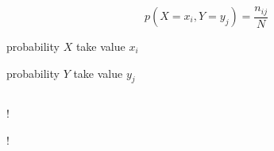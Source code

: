 \documentclass[11pt, a4paper, oneside]{book}
\begin{document}
\begin{equation}
p(X = x_i, Y = y_j) = \frac{n_{ij}}{N}
\tag{1.5}
\end{equation}

\begin{description}[labelwidth=\widthof{\bfseries 1234567890},align=parright]
	\item[$X = x_i :$] probability $X$ take value $x_i$
	\item[$Y = y_j :$] probability $Y$ take value $y_j$
\end{description}

\bigskip

\begin{equation}
\tag{}
\end{equation}

\begin{description}[labelwidth=\widthof{\bfseries 1234567890},align=parright]
	\item[$!$] !
	\item[$!$] !
\end{description}
\end{document}

